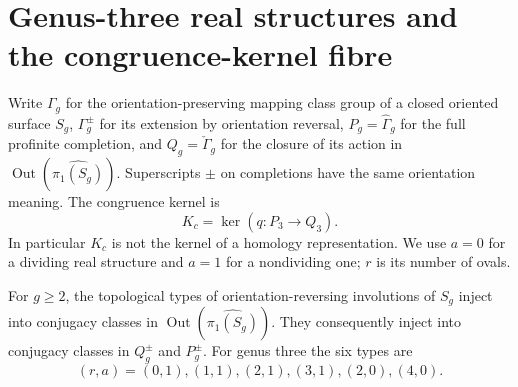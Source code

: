 \section{Genus-three real structures and the congruence-kernel fibre}

Write $\Gamma_g$ for the orientation-preserving mapping class group of
a closed oriented surface $S_g$, $\Gamma_g^{\pm}$ for its extension
by orientation reversal, $P_g=\widehat\Gamma_g$ for the full profinite
completion, and $Q_g=\check\Gamma_g$ for the closure of its action
in $\operatorname{Out}(\widehat{\pi_1(S_g)})$.  Superscripts $\pm$
on completions have the same orientation meaning.  The congruence
kernel is
\[
 K_c=\ker(q:P_3\longrightarrow Q_3).
\]
In particular $K_c$ is not the kernel of a homology representation.
We use $a=0$ for a dividing real structure and $a=1$ for a
nondividing one; $r$ is its number of ovals.

For $g\geq2$, the topological types of orientation-reversing
involutions of $S_g$ inject into conjugacy classes in
$\operatorname{Out}(\widehat{\pi_1(S_g)})$.  They consequently
inject into conjugacy classes in $Q_g^{\pm}$ and $P_g^{\pm}$.
For genus three the six types are
\[
 (r,a)=(0,1),(1,1),(2,1),(3,1),(2,0),(4,0).                 \tag{E.1.1}
\]

